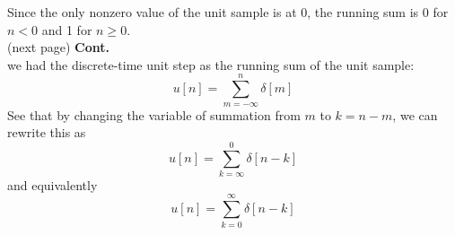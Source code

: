 \documentclass{report}
\begin{document}
Since the only nonzero value of the unit sample is at 0, the running sum is 0 for $n<0$ and 1 for $n\geq0$.\\
(next page)\newpage
\noindent\textbf{Cont.}\\
we had the discrete-time unit step as the running sum of the unit sample:
\begin{equation*}
u[n]=\sum^n_{m=-\infty}\delta[m]
\end{equation*}
See that by changing the variable of summation from $m$ to $k=n-m$, we can rewrite this as
\begin{equation*}
u[n]=\sum^0_{k=\infty}\delta[n-k]
\end{equation*}
and equivalently
\begin{equation*}
u[n]=\sum^\infty_{k=0}\delta[n-k]
\end{equation*}
\end{document}
